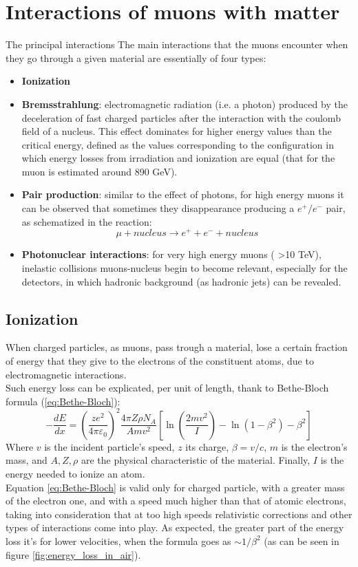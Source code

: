 \documentclass[a4paper,11pt]{book}
\begin{document}
\section{Interactions of muons with matter}

The principal interactions 
The main interactions that the muons encounter when they go through a given material are essentially of four types:
\begin{itemize}
\item \textbf{Ionization}
\item \textbf{Bremsstrahlung}: electromagnetic radiation (i.e. a photon) produced by the deceleration of fast charged particles after the interaction with the coulomb field of a nucleus. This effect dominates for higher energy values than the critical energy, defined as the values corresponding to the configuration in which energy losses from irradiation and ionization are equal (that for the muon is estimated around 890 GeV).\\
\item \textbf{Pair production}: similar to the effect of photons, for high energy muons it can be observed that sometimes they disappearance producing a $e^+/e^-$ pair, as schematized in the reaction:
\[ \mu + nucleus \to e^+ + e^- + nucleus \]
\item \textbf{Photonuclear interactions}: for very high energy muons ( \textgreater 10 TeV), inelastic collisions muons-nucleus begin to become relevant, especially for the detectors, in which hadronic background (as hadronic jets) can be revealed.\\
\end{itemize}

\subsection{Ionization}
When charged particles, as muons, pass trough a material, lose a certain fraction of energy that they give to the electrons of the constituent atoms, due to electromagnetic interactions.\\
Such energy loss can be explicated, per unit of length, thank to Bethe-Bloch formula (\ref{eq:Bethe-Bloch}):
\begin{equation}
-\frac{dE}{dx} = \left(\frac{ze^2}{4\pi\varepsilon_0}\right)^2\frac{4\pi Z\rho N_A}{Amv^2}\left[\ln\left(\frac{2mv^2}{I}\right)-\ln(1-\beta^2)-\beta^2\right]
\label{eq:Bethe-Bloch}
\end{equation}
Where $v$ is the incident particle's speed, $z$ its charge, $\beta = v/c$, $m$ is the electron's mass, and $A,Z,\rho$ are the physical characteristic of the material. Finally, $I$ is the energy needed to ionize an atom.\\
Equation \ref{eq:Bethe-Bloch} is valid only for charged particle, with a greater mass of the electron one, and with a speed much higher than that of atomic electrons, taking into consideration that at too high speeds relativistic corrections and other types of interactions come into play. As expected, the greater part of the energy loss it's for lower velocities, when the formula goes as $\sim 1/\beta^2$ (as can be seen in figure \ref{fig:energy_loss_in_air}).\\
\end{document}
